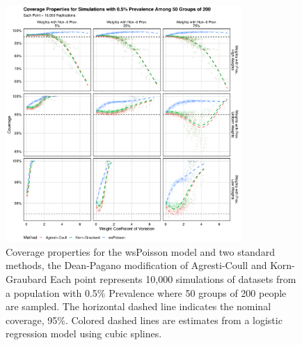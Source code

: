 \documentclass[AMA,STIX1COL]{WileyNJD-v2}
\begin{document}
\begin{figure}
\centering
\includegraphics[width=0.8\textwidth]{figures/perfect_coverage_50_groups_0_005_prev.pdf}
\caption{Coverage properties for the wsPoisson model and two standard methods, the Dean-Pagano modification of Agresti-Coull and Korn-Graubard
Each point represents 10,000 simulations of datasets from a population with 0.5\% Prevalence where 50 groups of 200 people are sampled.
The horizontal dashed line indicates the nominal coverage, 95\%.
Colored dashed lines are estimates from a logistic regression model using cubic splines.}
\label{fig:perfect_coverage_50_groups_0_005_prev}
\end{figure}
\end{document}
